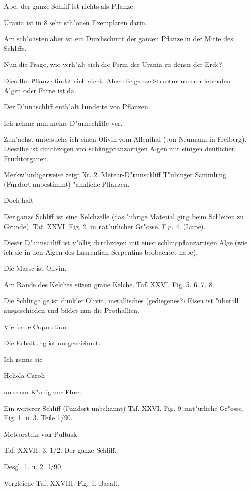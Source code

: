 \documentclass[a4paper, 11pt, oneside, german]{article}
\begin{document}
Aber der ganze Schliff ist nichts als Pflanze.

Urania ist in 8 sehr sch"onen Exemplaren darin.

Am sch"onsten aber ist ein Durchschnitt der ganzen Pflanze in der Mitte des Schliffs.

Nun die Frage, wie verh"alt sich die Form der Urania zu denen der Erde?

Dieselbe Pflanze findet sich nicht. Aber die ganze Structur unserer lebenden Algen oder Farne ist da.

Der D"unnschliff enth"alt hunderte von Pflanzen.

Ich nehme nun meine D"unnschliffe vor.

Zun"achst untersuche ich einen Olivin vom Allenthal (von Neumann in Freiberg). Dieselbe ist durchzogen von schlingpflanzartigen Algen mit einigen deutlichen Fruchtorganen.

Merkw"urdigerweise zeigt Nr. 2. Meteor-D"unnschliff T"ubinger Sammlung (Fundort unbestimmt) "ahnliche Pflanzen.

Doch halt ---

Der ganze Schliff ist eine Kelchzelle (das "ubrige Material ging beim Schleifen zu Grunde). Taf. XXVI. Fig. 2. in nat"urlicher Gr"osse. Fig. 4. (Lupe).

Dieser D"unnschliff ist v"ollig durchzogen mit einer schlingpflanzartigen Alge (wie ich sie in den Algen des Laurentian-Serpentins beobachtet habe).

Die Masse ist Olivin.

Am Rande des Kelches sitzen graue Kelche. Taf. XXVI. Fig. 5. 6. 7. 8.

Die Schlingalge ist dunkler Olivin, metallisches (gediegenes?) Eisen ist "uberall ausgeschieden und bildet nun die Prothallien.

Vielfache Copulation.

Die Erhaltung ist ausgezeichnet.

Ich nenne sie

Heliola Caroli

unserem K"onig zur Ehre.

    Ein weiterer Schliff (Fundort unbekannt) Taf. XXVI. Fig. 9. nat"urliche Gr"osse. Fig. 1. u. 3. Teile 1/90.

    Meteorstein von Pultusk

Taf. XXVII. 3. 1/2. Der ganze Schliff.

    Desgl. 1. u. 2. 1/90.

Vergleiche Taf. XXVIII. Fig. 1. Basalt.
\end{document}
